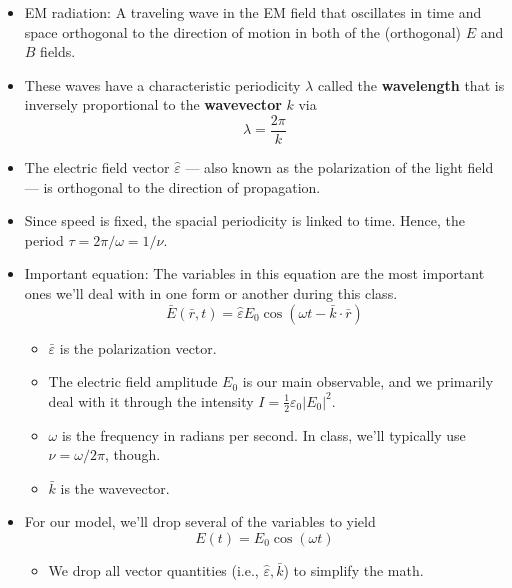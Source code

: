 \documentclass[../notes.tex]{subfiles}
\begin{document}
\begin{itemize}
    \begin{itemize}
        \item EM radiation: A traveling wave in the EM field that oscillates in time and space orthogonal to the direction of motion in both of the (orthogonal) $E$ and $B$ fields.
        \item These waves have a characteristic periodicity $\lambda$ called the \textbf{wavelength} that is inversely proportional to the \textbf{wavevector} $k$ via
        \begin{equation*}
            \lambda = \frac{2\pi}{k}
        \end{equation*}
        \item The electric field vector $\hat{\varepsilon}$ --- also known as the polarization of the light field --- is orthogonal to the direction of propagation.
        \item Since speed is fixed, the spacial periodicity is linked to time. Hence, the period $\tau=2\pi/\omega=1/\nu$.
        \item Important equation: The variables in this equation are the most important ones we'll deal with in one form or another during this class.
        \begin{equation*}
            \bar{E}(\bar{r},t) = \hat{\varepsilon}E_0\cos(\omega t-\bar{k}\cdot\bar{r})
        \end{equation*}
        \begin{itemize}
            \item $\bar{\varepsilon}$ is the polarization vector.
            \item The electric field amplitude $E_0$ is our main observable, and we primarily deal with it through the intensity $I=\frac{1}{2}\varepsilon_0|E_0|^2$.
            \item $\omega$ is the frequency in radians per second. In class, we'll typically use $\nu=\omega/2\pi$, though.
            \item $\bar{k}$ is the wavevector.
        \end{itemize}
        \item For our model, we'll drop several of the variables to yield
        \begin{equation*}
            E(t) = E_0\cos(\omega t)
        \end{equation*}
        \begin{itemize}
            \item We drop all vector quantities (i.e., $\hat{\varepsilon},\bar{k}$) to simplify the math.

\end{itemize}
\end{itemize}
\end{itemize}
\end{document}
